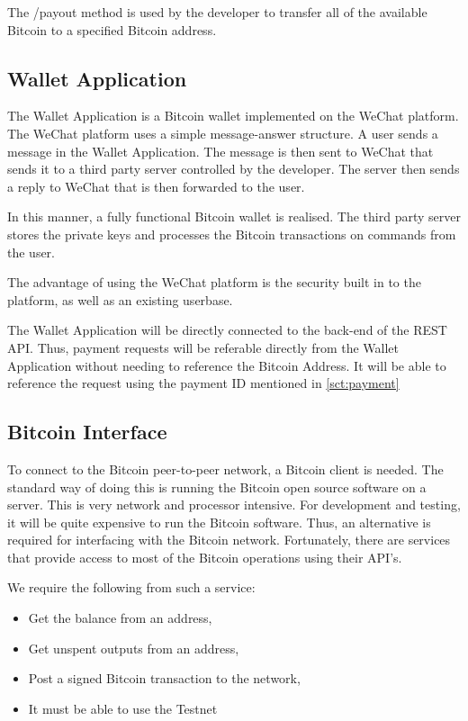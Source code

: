 The /payout method is used by the developer to transfer all of the available Bitcoin to a specified Bitcoin address.

\subsection{Wallet Application}

The Wallet Application is a Bitcoin wallet implemented on the WeChat platform. The WeChat platform uses a simple message-answer structure. A user sends a message in the Wallet Application. The message is then sent to WeChat that sends it to a third party server controlled by the developer. The server then sends a reply to WeChat that is then forwarded to the user. 

In this manner, a fully functional Bitcoin wallet is realised. The third party server stores the private keys and processes the Bitcoin transactions on commands from the user.

The advantage of using the WeChat platform is the security built in to the platform, as well as an existing userbase. 

The Wallet Application will be directly connected to the back-end of the REST API. Thus, payment requests will be referable directly from the Wallet Application without needing to reference the Bitcoin Address. It will be able to reference the request using the payment ID mentioned in \ref{sct:payment}

\subsection{Bitcoin Interface}
\label{sct:bitcoin_interface}

To connect to the Bitcoin peer-to-peer network, a Bitcoin client is needed. The standard way of doing this is running the Bitcoin open source software on a server. This is very network and processor intensive. For development and testing, it will be quite expensive to run the Bitcoin software. Thus, an alternative is required for interfacing with the Bitcoin network. Fortunately, there are services that provide access to most of the Bitcoin operations using their API's. 

We require the following from such a service:

\begin{itemize}
	\item Get the balance from an address,
	\item Get unspent outputs from an address,
	\item Post a signed Bitcoin transaction to the network,
	\item It must be able to use the Testnet
\end{itemize}

